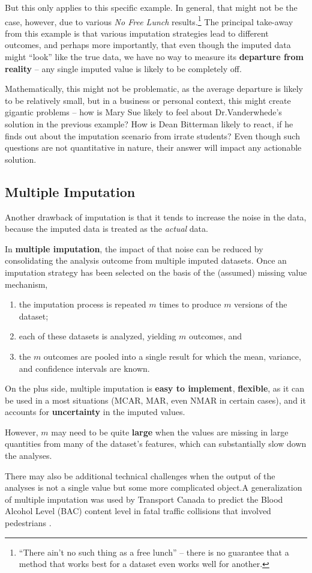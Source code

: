 \newl
But this only applies to this specific example. In general, that might not be the case, however, due to various \textit{No Free Lunch} results.\footnote{``There ain't no such thing as a free lunch'' -- there is no guarantee that a method that works best for a dataset even works well for another.} \newpage \noindent The principal take-away from this example is that various imputation strategies lead to different outcomes, and perhaps more importantly, that even though the imputed data might ``look'' like the true data, we have no way to measure its \textbf{departure from reality} -- any single imputed value is likely to be completely off. \par Mathematically, this might not be problematic, as the average departure is likely to be relatively small, but in a business or personal context, this might create gigantic problems  -- how is Mary Sue likely to feel about Dr.\@ Vanderwhede's solution in the previous example? How is Dean Bitterman likely to react, if he finds out about the imputation scenario from irrate students? \newl Even though such questions are not quantitative in nature, their answer will impact any actionable  solution.  
\subsection{Multiple Imputation}
Another drawback of imputation is that it tends to increase the noise in the data, because the imputed data is treated as the \textit{actual} data. \par  In \textbf{multiple imputation}, the impact of that noise can be reduced by consolidating the analysis outcome from multiple imputed datasets. Once an imputation strategy has been selected on the basis of the (assumed) missing value mechanism, 
\begin{enumerate}[noitemsep]
\item the imputation process is repeated $m$ times to produce $m$ versions of the dataset;
\item each of these datasets is analyzed, yielding $m$ outcomes, and  
\item the $m$ outcomes are pooled into a single result for which the mean, variance, and confidence intervals are known.
\end{enumerate}\newpage\noindent 
On the plus side, multiple imputation is \textbf{easy to implement}, \textbf{flexible}, as it can  be used in a most situations (MCAR, MAR, even NMAR in certain cases), and it accounts for \textbf{uncertainty} in the imputed values. \par However, $m$ may need to be quite \textbf{large} when the values are missing in large quantities from many of the dataset's features, which can substantially slow down the analyses. \par There may also be additional technical challenges when the output of the analyses is not a single value but some more complicated object.\newl A generalization of multiple imputation was used by Transport Canada to predict the Blood Alcohol Level (BAC) content level in fatal traffic collisions that involved pedestrians \cite{CP_BAC}.

